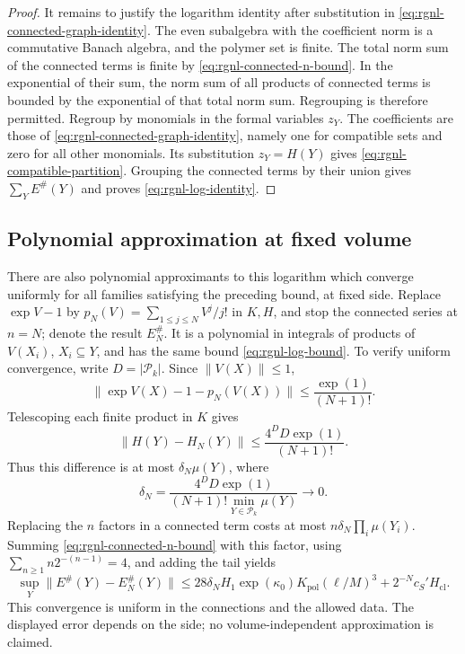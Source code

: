 \begin{proof}
It remains to justify the logarithm identity after
substitution in \eqref{eq:rgnl-connected-graph-identity}.
The even subalgebra with the coefficient norm is a
commutative Banach algebra, and the polymer set is finite.
The total norm sum of the connected terms is finite by
\eqref{eq:rgnl-connected-n-bound}.
In the exponential of their sum, the norm sum of all
products of connected terms is bounded by the exponential
of that total norm sum. Regrouping is therefore permitted.
Regroup by monomials in the formal variables $z_Y$.
The coefficients are those of
\eqref{eq:rgnl-connected-graph-identity}, namely one
for compatible sets and zero for all other monomials.
Its substitution $z_Y=H(Y)$ gives
\eqref{eq:rgnl-compatible-partition}. Grouping the
connected terms by their union gives
$\sum_YE^\#(Y)$ and proves \eqref{eq:rgnl-log-identity}.
\end{proof}

\subsection{Polynomial approximation at fixed volume}\label{subsec:rgnl-polynomial-approximation}

There are also polynomial approximants to this logarithm
which converge uniformly for all families satisfying the
preceding bound, at fixed side. Replace $\exp V-1$ by
$p_N(V)=\sum_{1\le j\le N}V^j/j!$ in $K,H$, and stop
the connected series at $n=N$; denote the result $E_N^\#$.
It is a polynomial in integrals of products of $V(X_i)$,
$X_i\subseteq Y$, and has the same bound
\eqref{eq:rgnl-log-bound}. To verify uniform convergence,
write $D=|\mathcal P_k|$. Since $\|V(X)\|\le1$,
\[
 \|\exp V(X)-1-p_N(V(X))\|
                                  \le\frac{\exp(1)}{(N+1)!}.
\]
Telescoping each finite product in $K$ gives
\[
 \|H(Y)-H_N(Y)\|\le
                             \frac{4^DD\exp(1)}{(N+1)!}.
\]
Thus this difference is at most $\delta_N\mu(Y)$, where
\[
 \delta_N=\frac{4^DD\exp(1)}
                      {(N+1)!\min_{Y\in\mathcal P_k}\mu(Y)}
                                                   \longrightarrow0.
\]
Replacing the $n$ factors in a connected term costs at
most $n\delta_N\prod_i\mu(Y_i)$. Summing
\eqref{eq:rgnl-connected-n-bound} with this factor, using
$\sum_{n\ge1}n2^{-(n-1)}=4$, and adding the tail yields
\[
 \sup_Y\|E^\#(Y)-E_N^\#(Y)\|
 \le28\delta_NH_1\exp(\kappa_0)K_{\mathrm{pol}}(\ell/M)^3
                                  +2^{-N}c_S'H_{\mathrm{cl}}.
\]
This convergence is uniform in the connections and the
allowed data. The displayed error depends on the side;
no volume-independent approximation is claimed.


